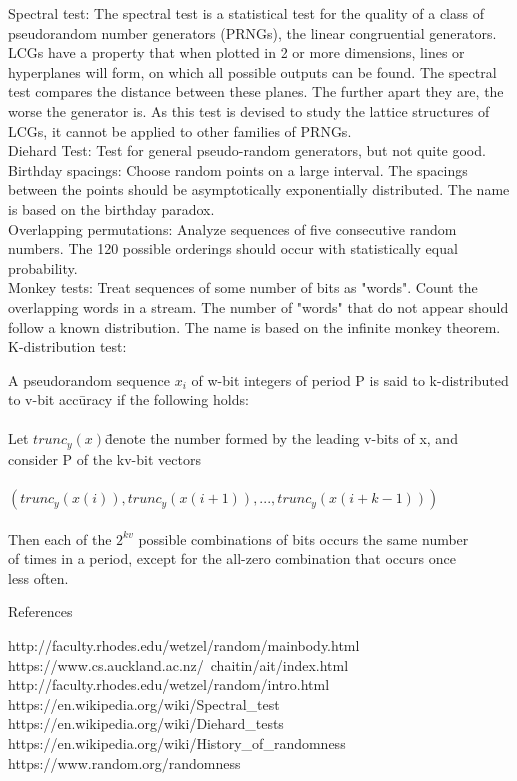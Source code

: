 \documentclass[12pt]{article}
\begin{document}
Spectral test: The spectral test is a statistical test for the quality of a class of pseudorandom number generators (PRNGs), the linear congruential generators. LCGs have a property that when plotted in 2 or more dimensions, lines or hyperplanes will form, on which all possible outputs can be found. The spectral test compares the distance between these planes. The further apart they are, the worse the generator is. As this test is devised to study the lattice structures of LCGs, it cannot be applied to other families of PRNGs.\\
Diehard Test: Test for general pseudo-random generators, but not quite good.\\
Birthday spacings: Choose random points on a large interval. The spacings between the points should be asymptotically exponentially distributed. The name is based on the birthday paradox.\\
Overlapping permutations: Analyze sequences of five consecutive random numbers. The 120 possible orderings should occur with statistically equal probability.\\
Monkey tests: Treat sequences of some number of bits as "words". Count the overlapping words in a stream. The number of "words" that do not appear should follow a known distribution. The name is based on the infinite monkey theorem.\\
K-distribution test: \begin{tabbing}A pseudorandom sequence $x_i$ of w-bit integers of period P is said to k-distributed\\
 to v-bit acc\=uracy if the following holds:\\\\
\> Let $trunc_y(x)$\= denote the number formed by the leading v-bits of x, and\\
\> consider P of the kv-bit vectors\\\\
\>\> $(trunc_y(x(i)),trunc_y(x(i+1)),...,trunc_y(x(i+k-1)))$\\\\
\> Then each of the $2^{kv}$ possible combinations of bits occurs the same number\\
\> of times in a period, except for the all-zero combination that occurs once\\
\> less often.\end{tabbing}
\begin{center}
References
\end{center}
http://faculty.rhodes.edu/wetzel/random/mainbody.html\\
https://www.cs.auckland.ac.nz/~chaitin/ait/index.html\\
http://faculty.rhodes.edu/wetzel/random/intro.html\\
https://en.wikipedia.org/wiki/Spectral\_test\\
https://en.wikipedia.org/wiki/Diehard\_tests\\
https://en.wikipedia.org/wiki/History\_of\_randomness\\
https://www.random.org/randomness
\end{document}
